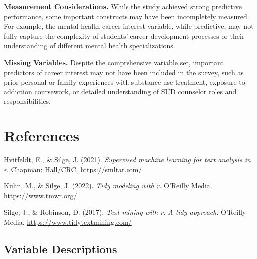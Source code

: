 \documentclass[
  man,
  longtable,
  nolmodern,
  notxfonts,
  notimes,
  colorlinks=true,linkcolor=blue,citecolor=blue,urlcolor=blue]{apa7}
\newlength{\cslhangindent}
\newenvironment{CSLReferences}[2] %
 {\begin{list}{}{%
  \setlength{\itemindent}{0pt}
  \setlength{\leftmargin}{0pt}
  \setlength{\parsep}{0pt}
  \ifodd #1
   \setlength{\leftmargin}{\cslhangindent}
   \setlength{\itemindent}{-1\cslhangindent}
  \fi
  \setlength{\itemsep}{#2\baselineskip}}}
 {\end{list}}
\begin{document}
\textbf{Measurement Considerations.} While the study achieved strong
predictive performance, some important constructs may have been
incompletely measured. For example, the mental health career interest
variable, while predictive, may not fully capture the complexity of
students' career development processes or their understanding of
different mental health specializations.

\textbf{Missing Variables.} Despite the comprehensive variable set,
important predictors of career interest may not have been included in
the survey, such as prior personal or family experiences with substance
use treatment, exposure to addiction coursework, or detailed
understanding of SUD counselor roles and responsibilities.

\section{References}\label{references}

\label{refs}
\begin{CSLReferences}{1}{0}
Hvitfeldt, E., \& Silge, J. (2021). \emph{Supervised machine learning
for text analysis in r}. Chapman; Hall/CRC. \url{https://smltar.com/}

Kuhn, M., \& Silge, J. (2022). \emph{Tidy modeling with r}. O'Reilly
Media. \url{https://www.tmwr.org/}

Silge, J., \& Robinson, D. (2017). \emph{Text mining with r: A tidy
approach}. O'Reilly Media. \url{https://www.tidytextmining.com/}

\end{CSLReferences}

\appendix

\subsection{Variable Descriptions}\label{variable-descriptions}
\end{document}
